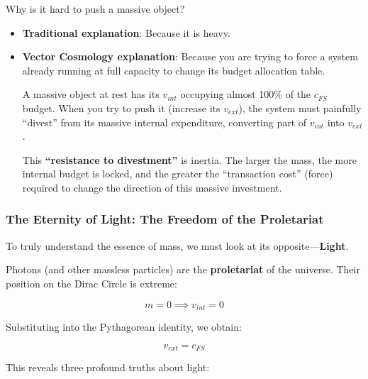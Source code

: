 Why is it hard to push a massive object?

\begin{itemize}
\item \textbf{Traditional explanation}: Because it is heavy.

\item \textbf{Vector Cosmology explanation}: Because you are trying to force a system already running at full capacity to change its budget allocation table.

    A massive object at rest has its $v_{int}$ occupying almost 100\% of the $c_{FS}$ budget. When you try to push it (increase its $v_{ext}$), the system must painfully ``divest'' from its massive internal expenditure, converting part of $v_{int}$ into $v_{ext}$.

    This \textbf{``resistance to divestment''} is inertia. The larger the mass, the more internal budget is locked, and the greater the ``transaction cost'' (force) required to change the direction of this massive investment.
\end{itemize}

\subsubsection{The Eternity of Light: The Freedom of the Proletariat}

To truly understand the essence of mass, we must look at its opposite---\textbf{Light}.

Photons (and other massless particles) are the \textbf{proletariat} of the universe. Their position on the Dirac Circle is extreme:

\[m = 0 \implies v_{int} = 0\]

Substituting into the Pythagorean identity, we obtain:

\[v_{ext} = c_{FS}\]

This reveals three profound truths about light:

